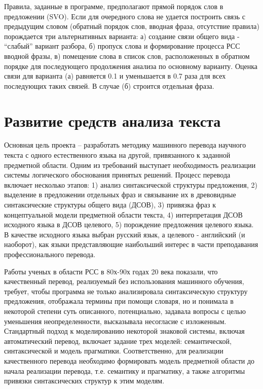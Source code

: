 \documentclass[
]{ceurart}
\begin{document}
Правила, заданные в программе, предполагают прямой порядок слов в
предложении (SVO). Если для очередного слова не удается построить связь
с предыдущим словом (обратный порядок слов, вводная фраза, отсутствие
правила) порождается три альтернативных варианта: а) создание связи
общего вида - ``слабый'' вариант разбора, б) пропуск слова и
формирование процесса РСС вводной фразы, в) помещение слова в список
слов, расположенных в обратном порядке для последующего продолжения
анализа по основному варианту. Оценка связи для варианта (а) равняется
0.1 и уменьшается в 0.7 раза для всех последующих таких связей. В случае
(б) строится отдельная фраза.

\section{Развитие средств анализа
текста}

Основная цель проекта -- разработать методику машинного перевода научного
текста с одного естественного языка на другой, привязанного к заданной
предметной области. Одним из требований выступает необходимость
реализации системы логического обоснования принятых решений. Процесс
перевода включает несколько этапов: 1) анализ синтаксической структуры
предложения, 2) выделение в предложении отдельных фраз и связывание их в
древовидные синтаксические структуры общего вида (ДСОВ), 3) привязка
фраз к концептуальной модели предметной области текста, 4) интерпретация
ДСОВ исходного языка в ДСОВ целевого, 5) порождение предложения целевого
языка. В качестве исходного языка выбран русский язык, а целевого -
английский (и наоборот), как языки представляющие наибольший интерес в
части преподавания профессионального перевода.

Работы ученых в области РСС в 80х-90х годах 20 века показали, что
качественный перевод, реализуемый без использования машинного обучения,
требует, чтобы программа не только анализировала синтаксическую
структуру предложения, отображала термины при помощи словаря, но и
понимала в некоторой степени суть описанного, потенциально, задавала
вопросы с целью уменьшения неопределенности, высказывала несогласие с
изложенным. Стандартный подход к моделированию некоторой знаковой
системы, включая автоматический перевод, включает задание трех моделей:
семантической, синтаксической и модель прагматики. Соответственно, для
реализации качественного перевода необходимо формировать модель
предметной области до начала реализации перевода, т.е. семантику и
прагматику, а также алгоритмы привязки синтаксических структур к этим
моделям.
\end{document}
